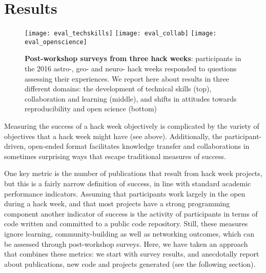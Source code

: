 \section*{Results}

\begin{figure*}[h!]
\begin{center}
\texttt{[image: eval\_techskills]}
\texttt{[image: eval\_collab]}
\texttt{[image: eval\_openscience]}
\caption{{\bf Post-workshop surveys from three hack weeks}: participants in the 2016 astro-, geo- and neuro- hack weeks responded to questions assessing their experiences. We report here about results in three different domains: the development of technical skills (top), collaboration and learning (middle), and shifts in attitudes towards reproducibility and open science (bottom)}
\label{fig:survey}
\end{center}
\end{figure*}

Measuring the success of a hack week objectively is complicated by the variety of objectives that a hack week might have (see above). 
Additionally, the participant-driven, open-ended format facilitates knowledge transfer and collaborations in sometimes surprising ways that escape traditional measures of success.

One key metric is the number of publications that result from hack week projects, but this is a fairly narrow definition of success, in line with standard academic performance indicators.
Assuming that participants work largely in the open during a hack week, and that most projects have a strong programming component another indicator of success is the activity of participants in terms of code written and committed to a public code repository.
Still, these measures ignore learning, community-building as well as networking outcomes, which can be assessed through post-workshop surveys.
Here, we have taken an approach that combines these metrics: we start with survey results, and anecdotally report about publications, new code and projects generated (see the following section).

